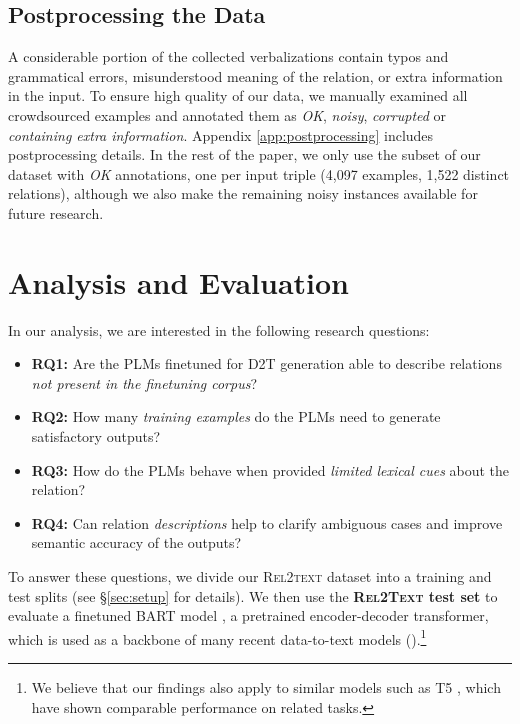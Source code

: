 \subsection{Postprocessing the Data}
A considerable portion of the collected verbalizations contain typos and grammatical errors, misunderstood meaning of the relation, or extra information in the input. To ensure high quality of our data, we manually examined all crowdsourced examples and annotated them as \textit{OK}, \textit{noisy}, \textit{corrupted} or \textit{containing extra information}.
Appendix \ref{app:postprocessing} includes postprocessing details.
In the rest of the paper, we only use the subset of our dataset with \textit{OK} annotations, one per input triple (4,097 examples, 1,522 distinct relations), although we also make the remaining noisy instances available for future research.


\section{Analysis and Evaluation}
In our analysis, we are interested in the following research questions:
\begin{itemize}
    \item \textbf{RQ1:} Are the PLMs finetuned for D2T generation able to describe relations \textit{not present in the finetuning corpus}?
    \item \textbf{RQ2:} How many \textit{training examples} do the PLMs need to generate satisfactory outputs?
    \item \textbf{RQ3:} How do the PLMs behave when provided \textit{limited lexical cues} about the relation?
    \item \textbf{RQ4:} Can relation \textit{descriptions} help to clarify ambiguous cases and improve semantic accuracy of the outputs?
\end{itemize}

To answer these questions, we divide our \textsc{Rel2text} dataset into a training and test splits (see §\ref{sec:setup} for details). We then use the \textbf{\textsc{Rel2Text} test set} to evaluate a finetuned BART model \cite{lewis2020bart}, a pretrained encoder-decoder transformer, which is used as a backbone of many recent data-to-text models (\citealp{ke2021jointgt,xing2021structure,ribeiro2020investigating,liu2021kg}).\footnote{We believe that our findings also apply to similar models such as T5 \cite{raffel2020exploring}, which have shown comparable performance on related tasks.}

